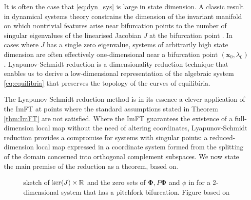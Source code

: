 \documentclass[letterpaper, 10 pt, conference, dvipsnames]{ieeeconf}
\begin{document}
It is often the case that \eqref{eq:dyn_sys} is large in state dimension. A classic result in dynamical systems theory constrains the dimension of the invariant manifold on which nontrivial features arise near bifurcation points to the number of singular eigenvalues of the linearised Jacobian \(J\) at the bifurcation point \cite[Theorem 3.2.1]{guckenheimer2013nonlinear}. In cases where  \(J\) has a single zero eigenvalue, systems of arbitrarily high state dimension are often effectively one-dimensional near a bifurcation point \((\mathbf{x}_0, \lambda_0)\). Lyapunov-Schmidt reduction is a dimensionality reduction technique that enables us to derive a low-dimensional representation of the algebraic system \eqref{eq:equilibria} that preserves the topology of the curves of equilibiria.

The Lyapunov-Schmidt reduction method is in its essence a clever application of the ImFT at points where the standard assumptions stated in Theorem \ref{thm:ImFT} are not satisfied. Where the ImFT guarantees the existence of a full-dimension local map without the need of altering coordinates, Lyapunov-Schmidt reduction provides a compromise for systems with singular points: a reduced-dimension local map expressed in a coordinate system formed from the splitting of the domain concerned into orthogonal complement subspaces. We now state the main premise of the reduction as a theorem, based on\cite[Ch. VII]{Golubitsky1985}.

\begin{figure}[ht!]
    \centering
    
    \caption{sketch of \(\ker(J)\times\mathbb{R}^{}\) and the zero sets of \(\boldsymbol{\Phi},P\boldsymbol{\Phi}\) and \(\phi\) in for a 2-dimensional system that has a pitchfork bifurcation. Figure based on \cite[Ch.I, Fig. 3.1]{Golubitsky1985} \label{fig:pitchfork}}
\end{figure}
\end{document}
